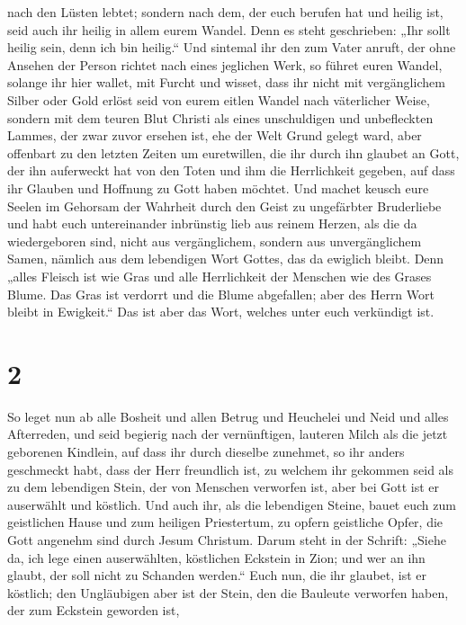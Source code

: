 nach den Lüsten lebtet;  sondern nach dem, der euch
berufen hat und heilig ist, seid auch ihr heilig in allem eurem Wandel.
 Denn es steht geschrieben: „Ihr sollt heilig sein, denn
ich bin heilig.``  Und sintemal ihr den zum Vater anruft,
der ohne Ansehen der Person richtet nach eines jeglichen Werk, so führet
euren Wandel, solange ihr hier wallet, mit Furcht  und
wisset, dass ihr nicht mit vergänglichem Silber oder Gold erlöst seid
von eurem eitlen Wandel nach väterlicher Weise,  sondern
mit dem teuren Blut Christi als eines unschuldigen und unbefleckten
Lammes,  der zwar zuvor ersehen ist, ehe der Welt Grund
gelegt ward, aber offenbart zu den letzten Zeiten um euretwillen,
 die ihr durch ihn glaubet an Gott, der ihn auferweckt
hat von den Toten und ihm die Herrlichkeit gegeben, auf dass ihr Glauben
und Hoffnung zu Gott haben möchtet.  Und machet keusch
eure Seelen im Gehorsam der Wahrheit durch den Geist zu ungefärbter
Bruderliebe und habt euch untereinander inbrünstig lieb aus reinem
Herzen,  als die da wiedergeboren sind, nicht aus
vergänglichem, sondern aus unvergänglichem Samen, nämlich aus dem
lebendigen Wort Gottes, das da ewiglich bleibt.  Denn
„alles Fleisch ist wie Gras und alle Herrlichkeit der Menschen wie des
Grases Blume. Das Gras ist verdorrt und die Blume abgefallen;
 aber des Herrn Wort bleibt in Ewigkeit.`` Das ist aber
das Wort, welches unter euch verkündigt ist.

\hypertarget{section-1}{%
\section{2}\label{section-1}}

 So leget nun ab alle Bosheit und allen Betrug und
Heuchelei und Neid und alles Afterreden,  und seid
begierig nach der vernünftigen, lauteren Milch als die jetzt geborenen
Kindlein, auf dass ihr durch dieselbe zunehmet,  so ihr
anders geschmeckt habt, dass der Herr freundlich ist,  zu
welchem ihr gekommen seid als zu dem lebendigen Stein, der von Menschen
verworfen ist, aber bei Gott ist er auserwählt und köstlich.
 Und auch ihr, als die lebendigen Steine, bauet euch zum
geistlichen Hause und zum heiligen Priestertum, zu opfern geistliche
Opfer, die Gott angenehm sind durch Jesum Christum.  Darum
steht in der Schrift: „Siehe da, ich lege einen auserwählten, köstlichen
Eckstein in Zion; und wer an ihn glaubt, der soll nicht zu Schanden
werden.``  Euch nun, die ihr glaubet, ist er köstlich; den
Ungläubigen aber ist der Stein, den die Bauleute verworfen haben, der
zum Eckstein geworden ist,

